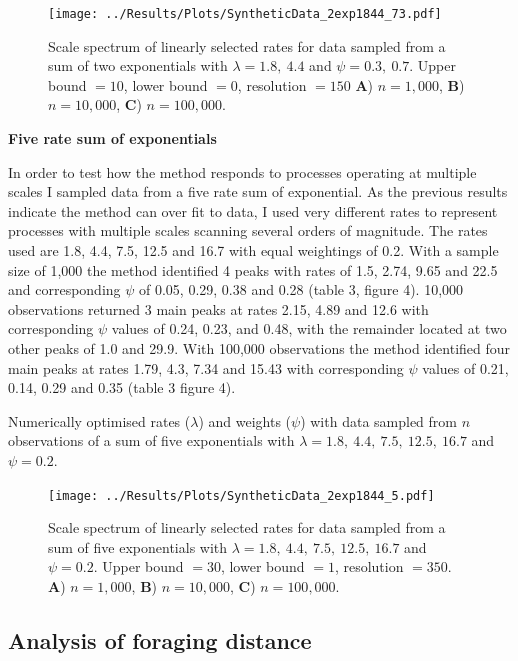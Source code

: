 \documentclass[11pt,usenames,dvipsnames,a4paper]{article}
\begin{document}
\begin{figure}[H]
	\centering
	\texttt{[image: ../Results/Plots/SyntheticData\_2exp1844\_73.pdf]}
	\caption{Scale spectrum of linearly selected rates for data sampled from a sum of two exponentials with $\lambda = 1.8,\ 4.4$ and $\psi = 0.3,\ 0.7$. Upper bound $= 10$, lower bound $= 0$, resolution $= 150$ \textbf{A}) $n = 1,000$, \textbf{B}) $n = 10,000$,  \textbf{C}) $n = 100,000$.}
\end{figure}

\noindent
\textbf{Five rate sum of exponentials}
\begin{linenumbers}

In order to test how the method responds to processes operating at multiple scales I sampled data from a five rate sum of exponential. As the previous results indicate the method can over fit to data, I used very different rates to represent processes with multiple scales scanning several orders of magnitude. The rates used are 1.8, 4.4, 7.5, 12.5 and 16.7 with equal weightings of 0.2. With a sample size of 1,000 the method identified 4 peaks with rates of 1.5, 2.74, 9.65 and 22.5 and corresponding $\psi$ of 0.05, 0.29, 0.38 and 0.28 (table 3, figure 4). 10,000 observations returned 3 main peaks at rates 2.15, 4.89 and 12.6 with corresponding $\psi$ values of 0.24, 0.23, and 0.48, with the remainder located at two other peaks of 1.0 and 29.9. With 100,000 observations the method identified four main peaks at rates 1.79, 4.3, 7.34 and 15.43 with corresponding $\psi$ values of 0.21, 0.14, 0.29 and 0.35 (table 3 figure 4). 
\end{linenumbers}
\begin{table}[H]
	\centering
	\caption{Numerically optimised rates ($\lambda$) and weights ($\psi$) with data sampled from $n$ observations of a sum of five exponentials with $\lambda = 1.8,\ 4.4,\ 7.5,\ 12.5,\ 16.7$ and $\psi = 0.2$.}
	
\end{table}
\begin{figure}[H]
	\centering
	\texttt{[image: ../Results/Plots/SyntheticData\_2exp1844\_5.pdf]}
	\caption{Scale spectrum of linearly selected rates for data sampled from a sum of five exponentials with $\lambda = 1.8,\ 4.4,\ 7.5,\ 12.5,\ 16.7$ and $\psi = 0.2$. Upper bound $= 30$, lower bound $= 1$, resolution $= 350$. \textbf{A}) $n = 1,000$, \textbf{B}) $n = 10,000$,  \textbf{C}) $n = 100,000$.}
\end{figure}

\subsection{Analysis of foraging distance}
\end{document}
